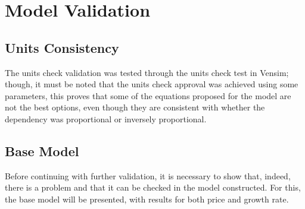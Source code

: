 \section{Model Validation}
\subsection{Units Consistency}
The units check validation was tested through the units check test in Vensim; though, it must be noted that the units check approval was achieved using some parameters, this proves that some of the equations proposed for the model are not the best options, even though they are consistent with whether the dependency was proportional or inversely proportional.
\subsection{Base Model}
	Before continuing with further validation, it is necessary to show that, indeed, there is a problem and that it can be checked in the model constructed. For this, the base model will be presented, with results for both price and growth rate.

